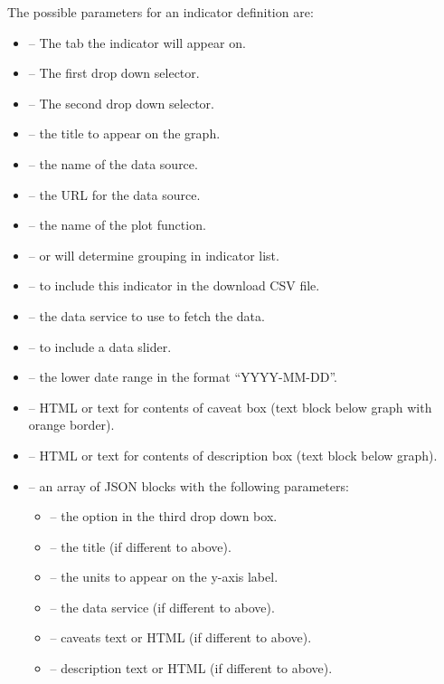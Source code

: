 \documentclass[12pt]{article}
\begin{document}
The possible parameters for an indicator definition are:
\begin{itemize}
\item {} -- The tab the indicator will appear on.
\item {} -- The first drop down selector.
\item {} -- The second drop down selector.
\item {} -- the title to appear on the graph.
\item {} -- the name of the data source.
\item {} -- the URL for the data source.
\item {} -- the name of the plot function.
\item {} --  or  will determine grouping in indicator list.
\item {} --   to include this indicator in the download CSV file.
\item {} -- the data service to use to fetch the data.
\item {} --  to include a data slider.
\item {} -- the lower date range in the format ``YYYY-MM-DD''.
\item {} -- HTML or text for contents of caveat box (text block below graph with orange border).
\item {} --  HTML or text for contents of description box (text block below graph).
\item {} -- an array of JSON blocks with the following parameters:
\begin{itemize}
\item {} -- the option in the third drop down box.
\item {} -- the title (if different to above).
\item {} -- the units to appear on the y-axis label.
\item {} -- the data service (if different to above).
\item {} -- caveats text or HTML (if different to above).
\item {} -- description text or HTML (if different to above).
\end{itemize}
\end{itemize}
\end{document}
